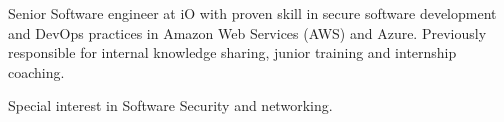 

\begin{cvparagraph}

Senior Software engineer at iO with proven skill in secure software development and DevOps practices in Amazon Web Services (AWS) and Azure.
Previously responsible for internal knowledge sharing, junior training and internship coaching.

Special interest in Software Security and networking.
\end{cvparagraph}
